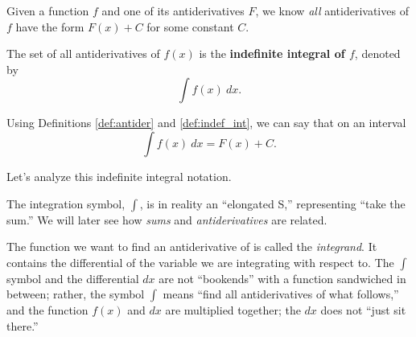 Given a function $f$ and one of its antiderivatives $F$, we know \textit{all} antiderivatives of $f$ have the form $F(x) + C$ for some constant $C$.

\begin{definition}\label{def:indef_int}
The set of all antiderivatives of $f(x)$ is the \textbf{indefinite integral of $f$}, denoted by
\[\int f(x) \ dx.\]
\end{definition}

Using Definitions \ref{def:antider} and \ref{def:indef_int}, we can say that on an interval
\[\int f(x) \ dx = F(x) + C.\]

Let's analyze this indefinite integral notation.
%
\begin{center}
\end{center}
%
The integration symbol, $\int$, is in reality an ``elongated S,'' representing ``take the sum.'' We will later see how \textit{sums} and \textit{antiderivatives} are related.

The function we want to find an antiderivative of is called the \textit{integrand}. It contains the differential of the variable we are integrating with respect to. The $\int$ symbol and the differential $dx$ are not ``bookends'' with a function sandwiched in between; rather, the symbol $\int$ means ``find all antiderivatives of what follows,'' and the function $f(x)$ and $dx$ are multiplied together; the $dx$ does not ``just sit there.''

